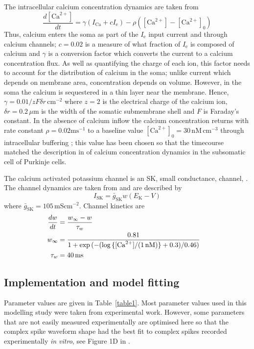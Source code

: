 \documentclass[utf8]{frontiersSCNS} %
\newcommand{\msi}{\,\mathrm{mS cm^{-2}}}
\newcommand{\mse}{\,\mathrm{ms}}
\newcommand{\cm}{\,\mathrm{cm}}
\renewcommand{\k}{\mathrm{K}}
\newcommand{\ca}{\mathrm{Ca}}
\newcommand{\sk}{\mathrm{SK}}
\begin{document}
The intracellular calcium concentration dynamics are taken from
\cite{SterrattEtAl2012,KochSegev1998}
\begin{equation}
\label{eq:ca_concentration}
\frac{d[\ca^{2+}]}{dt}=\gamma (I_\ca+cI_{\mathrm{e}})  -
\rho ([\ca^{2+}]-[\ca^{2+}]_0)
\end{equation}
Thus, calcium enters the soma as part of the $I_\mathrm{e}$ input
current and through calcium channels; $c=0.02$ is a measure of what
fraction of $I_{\mathrm{e}}$ is composed of calcium and $\gamma$ is a
conversion factor which converts the current to a calcium
concentration flux. As well as quantifying the charge of each ion,
this factor needs to account for the distribution of calcium in the
soma; unlike current which depends on membrane area, concentration
depends on volume. However, in the soma the calcium is sequestered in
a thin layer near the membrane. Hence, $\gamma=0.01/zF\delta
r\,\mathrm{cm}^{-2}$ where $z=2$ is the electrical charge of the
calcium ion, $\delta r=0.2\,\mu\mathrm{m}$ is the width of the somatic
submembrane shell and $F$ is Faraday's constant. In the absence of
calcium inflow the calcium concentration returns with rate constant
$\rho=0.02\mathrm{ms}^{-1}$ to a baseline value $[\ca^{2+}]_0
=30\,\mathrm{nM}\cm^{-3}$ through intracellular buffering
\cite{FierroEtAl1998,AiraksinenEtAl1997}; this value has been chosen
so that the timecourse matched the description in
\cite{EilersEtAl1995} of calcium concentration dynamics in the
subsomatic cell of Purkinje cells.

The calcium activated potassium channel is an SK, small conductance,
channel, \cite{LancasterEtAl1991}. The channel dynamics are taken from
\cite{GilliesWillshaw2006} and are described by
\begin{equation}
\label{eq:I_SK}
I_{\sk} = {\bar{g}_{\sk}}w(E_\k-V)
\end{equation}
where $\bar{g}_\sk = 105\msi$. Channel kinetics are
\begin{align}
\label{eq:w_kinetics}
\frac{dw}{dt} &= \frac{w_\infty- w}{\tau_w}\cr
w_{\infty}   &= \frac{0.81}{1 + \exp{(-(\log{\{[\ca^{2+}]/(1\,\mathrm{nM})\}}+0.3)/0.46)}}\cr
\tau_w &= 40 \mse
\end{align}

\subsection{Implementation and model fitting}

Parameter values are given in Table~\ref{table1}. Most parameter
values used in this modelling study were taken from experimental
work. However, some parameters that are not easily measured
experimentally are optimised here so that the complex spike waveform
shape had the best fit to complex spikes recorded experimentally
\textit{in vitro}, see Figure 1D in \cite{DavieEtAl2008}.
\end{document}
